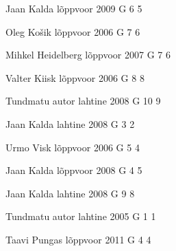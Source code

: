 \documentclass[11pt]{article}
\begin{document}
{Jaan Kalda} %
{lõppvoor} %
{2009} %
{G 6} %
{5} %
{

\ifEngHint
\fi
}

{Oleg Košik} %
{lõppvoor} %
{2006} %
{G 7} %
{6} %
{

\ifEngHint
\fi
}

{Mihkel Heidelberg} %
{lõppvoor} %
{2007} %
{G 7} %
{6} %
{

\ifEngHint
\fi
}

{Valter Kiisk} %
{lõppvoor} %
{2006} %
{G 8} %
{8} %
{

\ifEngHint
\fi
}

{Tundmatu autor} %
{lahtine} %
{2008} %
{G 10} %
{9} %
{

\ifEngHint
\fi
}

{Jaan Kalda} %
{lahtine} %
{2008} %
{G 3} %
{2} %
{

\ifEngHint
\fi
}

{Urmo Visk} %
{lõppvoor} %
{2006} %
{G 5} %
{4} %
{

\ifEngHint
\fi
}

{Jaan Kalda} %
{lõppvoor} %
{2008} %
{G 4} %
{5} %
{

\ifEngHint
\fi
}

{Jaan Kalda} %
{lahtine} %
{2008} %
{G 9} %
{8} %
{

\ifEngHint
\fi
}

{Tundmatu autor} %
{lahtine} %
{2005} %
{G 1} %
{1} %
{

\ifEngHint
\fi
}

{Taavi Pungas} %
{lõppvoor} %
{2011} %
{G 4} %
{4} %
{

\ifEngHint
\fi
}
\end{document}
